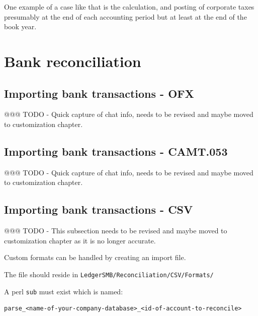 One example of a case like that is the calculation, and posting of
corporate taxes presumably at the end of each accounting period but at least
at the end of the book year.



\section{Bank reconciliation}
\label{sec-business-processes-accounting-reconciliation}

\subsection{Importing bank transactions - OFX}
\label{subsec-importing-bank-transactions-ofx}

@@@ TODO - Quick capture of chat info, needs to be revised and maybe moved to customization chapter.

\subsection{Importing bank transactions - CAMT.053}
\label{subsec-importing-bank-transactions-camt}

@@@ TODO - Quick capture of chat info, needs to be revised and maybe moved to customization chapter.

\subsection{Importing bank transactions - CSV}
\label{subsec-importing-bank-transactions-csv}


@@@ TODO - This subsection needs to be revised and maybe moved to customization chapter as it is no longer accurate.


Custom formats can be handled by creating an import file.

The file should reside in \texttt{LedgerSMB/Reconciliation/CSV/Formats/}

A perl \texttt{sub} must exist which is named:

\begin{verbatim}
parse_<name-of-your-company-database>_<id-of-account-to-reconcile>
\end{verbatim}

